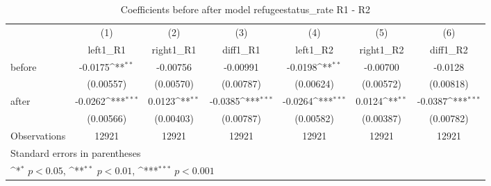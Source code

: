 \begin{table}[htbp]\centering
\def\sym#1{\ifmmode^{#1}\else\(^{#1}\)\fi}
\caption{Coefficients before after model refugeestatus\_rate R1 - R2}
\begin{tabular}{l*{6}{c}}
\hline\hline
                    &\multicolumn{1}{c}{(1)}&\multicolumn{1}{c}{(2)}&\multicolumn{1}{c}{(3)}&\multicolumn{1}{c}{(4)}&\multicolumn{1}{c}{(5)}&\multicolumn{1}{c}{(6)}\\
                    &\multicolumn{1}{c}{left1\_R1}&\multicolumn{1}{c}{right1\_R1}&\multicolumn{1}{c}{diff1\_R1}&\multicolumn{1}{c}{left1\_R2}&\multicolumn{1}{c}{right1\_R2}&\multicolumn{1}{c}{diff1\_R2}\\
\hline
before              &     -0.0175\sym{**} &    -0.00756         &    -0.00991         &     -0.0198\sym{**} &    -0.00700         &     -0.0128         \\
                    &   (0.00557)         &   (0.00570)         &   (0.00787)         &   (0.00624)         &   (0.00572)         &   (0.00818)         \\
[1em]
after               &     -0.0262\sym{***}&      0.0123\sym{**} &     -0.0385\sym{***}&     -0.0264\sym{***}&      0.0124\sym{**} &     -0.0387\sym{***}\\
                    &   (0.00566)         &   (0.00403)         &   (0.00787)         &   (0.00582)         &   (0.00387)         &   (0.00782)         \\
\hline
Observations        &       12921         &       12921         &       12921         &       12921         &       12921         &       12921         \\
\hline\hline
\multicolumn{7}{l}{\footnotesize Standard errors in parentheses}\\
\multicolumn{7}{l}{\footnotesize \sym{*} \(p<0.05\), \sym{**} \(p<0.01\), \sym{***} \(p<0.001\)}\\
\end{tabular}
\end{table}
